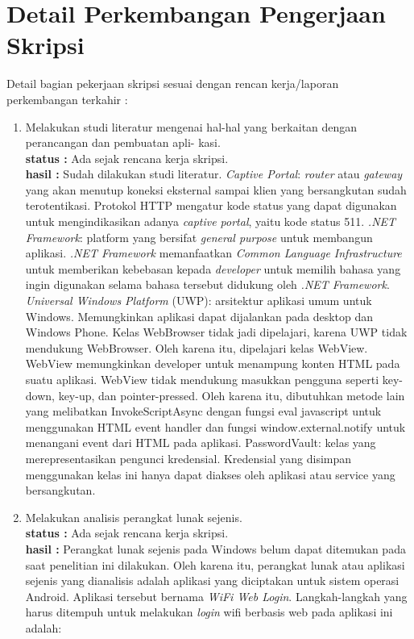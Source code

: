 \documentclass[a4paper,twoside]{article}
\begin{document}
\section{Detail Perkembangan Pengerjaan Skripsi}
Detail bagian pekerjaan skripsi sesuai dengan rencan kerja/laporan perkembangan terkahir :
	\begin{enumerate}
		\item Melakukan studi literatur mengenai hal-hal yang berkaitan dengan perancangan dan pembuatan apli-
kasi.\\
		{\bf status :} Ada sejak rencana kerja skripsi.\\
		{\bf hasil :} Sudah dilakukan studi literatur. \textit{Captive Portal}: \textit{router} atau \textit{gateway} yang akan menutup koneksi eksternal sampai klien yang bersangkutan sudah terotentikasi. Protokol HTTP mengatur kode status yang dapat digunakan untuk mengindikasikan adanya \textit{captive portal}, yaitu kode status 511. \textit{.NET Framework}: platform yang bersifat \textit{general purpose} untuk membangun aplikasi. \textit{.NET Framework} memanfaatkan \textit{Common Language Infrastructure} untuk memberikan kebebasan kepada \textit{developer} untuk memilih bahasa yang ingin digunakan selama bahasa tersebut didukung oleh \textit{.NET Framework}. \textit{Universal Windows Platform} (UWP): arsitektur aplikasi umum untuk Windows. Memungkinkan aplikasi dapat dijalankan pada desktop dan Windows Phone. Kelas WebBrowser tidak jadi dipelajari, karena UWP tidak mendukung WebBrowser. Oleh karena itu, dipelajari kelas WebView. WebView memungkinkan developer untuk menampung konten HTML pada suatu aplikasi. WebView tidak mendukung masukkan pengguna seperti key-down, key-up, dan pointer-pressed. Oleh karena itu, dibutuhkan metode lain yang melibatkan InvokeScriptAsync dengan fungsi eval javascript untuk menggunakan HTML event handler dan fungsi window.external.notify untuk menangani event dari HTML pada aplikasi. PasswordVault: kelas yang merepresentasikan pengunci kredensial.  Kredensial yang disimpan menggunakan kelas ini hanya dapat diakses oleh aplikasi atau service yang bersangkutan.
		
		\item Melakukan analisis perangkat lunak sejenis.\\
		{\bf status :} Ada sejak rencana kerja skripsi.\\
		{\bf hasil :} Perangkat lunak sejenis pada Windows belum dapat ditemukan pada saat penelitian ini dilakukan. Oleh karena itu, perangkat lunak atau aplikasi sejenis yang dianalisis adalah aplikasi yang diciptakan untuk sistem operasi Android. Aplikasi tersebut bernama \textit{WiFi Web Login}. Langkah-langkah yang harus ditempuh untuk melakukan \textit{login} wifi berbasis web pada aplikasi ini adalah:


\end{enumerate}
\end{document}
